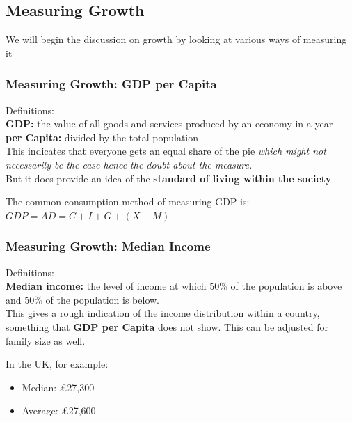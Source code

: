 \documentclass[12pt, letterpaper]{article}
\begin{document}
\subsection{Measuring Growth}
We will begin the discussion on growth by looking at various ways of measuring it

\subsubsection{Measuring Growth: GDP per Capita}
Definitions:\\
\textbf{GDP:} the value of all goods and services produced by an economy in a year \\
\textbf{per Capita:} divided by the total population \\

This indicates that everyone gets an equal share of the pie \textit{which might not necessarily be the case hence the doubt about the measure.} \\
But it does provide an idea of the \textbf{standard of living within the society} \\
\begin{center}
	The common consumption method of measuring GDP is:\\
	$GDP = AD = C + I + G + (X-M)$
\end{center}

\subsubsection{Measuring Growth: Median Income}
Definitions:\\
\textbf{Median income:} the level of income at which 50\% of the population is above and 50\% of the population is below.\\

This gives a rough indication of the income distribution within a country, something that \textbf{GDP per Capita} does not show. This can be adjusted for family size as well.
\begin{center}
	In the UK, for example:
	\begin{itemize}
		\item Median: £27,300
		\item Average: £27,600
	\end{itemize}
\end{center}
\end{document}
